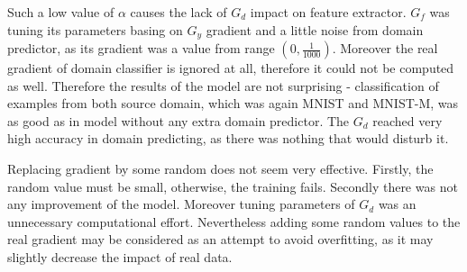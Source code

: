 \documentclass{article}
\begin{document}
\par
Such a low value of $\alpha$ causes the lack of $G_{d}$ impact on feature extractor. $G_{f}$ was tuning its parameters basing on $G_{y}$ gradient and a little noise from domain predictor, as its gradient was a value from range $(0, \frac{1}{1000})$. Moreover the real gradient of domain classifier is ignored at all, therefore it could not be computed as well. Therefore the results of the model are not surprising - classification of examples from both source domain, which was again MNIST and MNIST-M, was as good as in model without any extra domain predictor. The $G_{d}$ reached very high accuracy in domain predicting, as there was nothing that would disturb it.
\par
Replacing gradient by some random does not seem very effective. Firstly, the random value must be small, otherwise, the training fails. Secondly there was not any improvement of the model. Moreover tuning parameters of $G_{d}$ was an unnecessary computational effort. Nevertheless adding some random values to the real gradient may be considered as an attempt to avoid overfitting, as it may slightly decrease the impact of real data.
\end{document}
